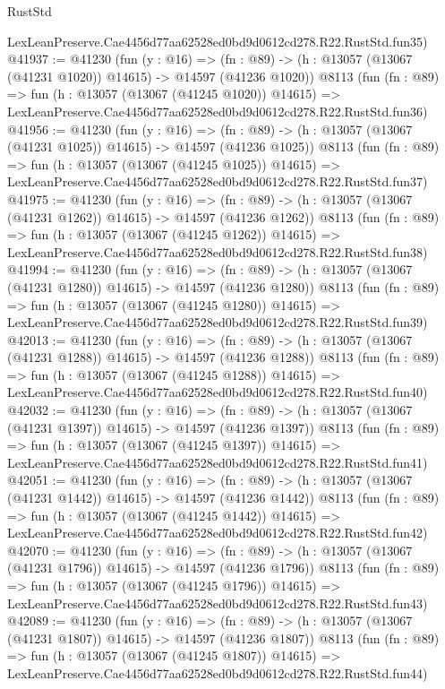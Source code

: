 \begin{lexlean}{RustStd}
\begin{coremodule}
    LexLeanPreserve.Cae4456d77aa62528ed0bd9d0612cd278.R22.RustStd.fun35)
@41937 := @41230
    (fun (y : @16) =>
    (fn : @89) -> (h : @13057 (@13067 (@41231 @1020)) @14615) -> @14597 (@41236 @1020))
    @8113
    (fun (fn : @89) =>
    fun (h : @13057 (@13067 (@41245 @1020)) @14615) =>
    LexLeanPreserve.Cae4456d77aa62528ed0bd9d0612cd278.R22.RustStd.fun36)
@41956 := @41230
    (fun (y : @16) =>
    (fn : @89) -> (h : @13057 (@13067 (@41231 @1025)) @14615) -> @14597 (@41236 @1025))
    @8113
    (fun (fn : @89) =>
    fun (h : @13057 (@13067 (@41245 @1025)) @14615) =>
    LexLeanPreserve.Cae4456d77aa62528ed0bd9d0612cd278.R22.RustStd.fun37)
@41975 := @41230
    (fun (y : @16) =>
    (fn : @89) -> (h : @13057 (@13067 (@41231 @1262)) @14615) -> @14597 (@41236 @1262))
    @8113
    (fun (fn : @89) =>
    fun (h : @13057 (@13067 (@41245 @1262)) @14615) =>
    LexLeanPreserve.Cae4456d77aa62528ed0bd9d0612cd278.R22.RustStd.fun38)
@41994 := @41230
    (fun (y : @16) =>
    (fn : @89) -> (h : @13057 (@13067 (@41231 @1280)) @14615) -> @14597 (@41236 @1280))
    @8113
    (fun (fn : @89) =>
    fun (h : @13057 (@13067 (@41245 @1280)) @14615) =>
    LexLeanPreserve.Cae4456d77aa62528ed0bd9d0612cd278.R22.RustStd.fun39)
@42013 := @41230
    (fun (y : @16) =>
    (fn : @89) -> (h : @13057 (@13067 (@41231 @1288)) @14615) -> @14597 (@41236 @1288))
    @8113
    (fun (fn : @89) =>
    fun (h : @13057 (@13067 (@41245 @1288)) @14615) =>
    LexLeanPreserve.Cae4456d77aa62528ed0bd9d0612cd278.R22.RustStd.fun40)
@42032 := @41230
    (fun (y : @16) =>
    (fn : @89) -> (h : @13057 (@13067 (@41231 @1397)) @14615) -> @14597 (@41236 @1397))
    @8113
    (fun (fn : @89) =>
    fun (h : @13057 (@13067 (@41245 @1397)) @14615) =>
    LexLeanPreserve.Cae4456d77aa62528ed0bd9d0612cd278.R22.RustStd.fun41)
@42051 := @41230
    (fun (y : @16) =>
    (fn : @89) -> (h : @13057 (@13067 (@41231 @1442)) @14615) -> @14597 (@41236 @1442))
    @8113
    (fun (fn : @89) =>
    fun (h : @13057 (@13067 (@41245 @1442)) @14615) =>
    LexLeanPreserve.Cae4456d77aa62528ed0bd9d0612cd278.R22.RustStd.fun42)
@42070 := @41230
    (fun (y : @16) =>
    (fn : @89) -> (h : @13057 (@13067 (@41231 @1796)) @14615) -> @14597 (@41236 @1796))
    @8113
    (fun (fn : @89) =>
    fun (h : @13057 (@13067 (@41245 @1796)) @14615) =>
    LexLeanPreserve.Cae4456d77aa62528ed0bd9d0612cd278.R22.RustStd.fun43)
@42089 := @41230
    (fun (y : @16) =>
    (fn : @89) -> (h : @13057 (@13067 (@41231 @1807)) @14615) -> @14597 (@41236 @1807))
    @8113
    (fun (fn : @89) =>
    fun (h : @13057 (@13067 (@41245 @1807)) @14615) =>
    LexLeanPreserve.Cae4456d77aa62528ed0bd9d0612cd278.R22.RustStd.fun44)

\end{coremodule}
\end{lexlean}
